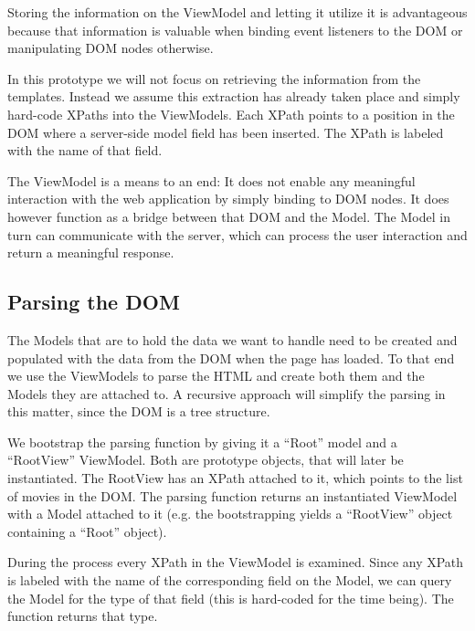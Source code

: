 \documentclass[thesis.tex]{subfiles}
\begin{document}
Storing the information on the ViewModel and letting it utilize it is
advantageous because that information is valuable when binding event listeners
to the DOM or manipulating DOM nodes otherwise.

In this prototype we will not focus on retrieving the information from
the templates. Instead we assume this extraction has already taken place and
simply hard-code XPaths into the ViewModels. Each XPath points to a
position in the DOM where a server-side model field has been inserted.
The XPath is labeled with the name of that field.

The ViewModel is a means to an end: It does not enable any meaningful
interaction with the web application by simply binding to DOM nodes.
It does however function as a bridge between that DOM and the Model.
The Model in turn can communicate with the server, which can process
the user interaction and return a meaningful response.

\subsection{Parsing the DOM}

The Models that are to hold the data we want to handle need to be created and
populated with the data from the DOM when the page has loaded.
To that end we use the ViewModels to parse the HTML and create both them and
the Models they are attached to.
A recursive approach will simplify the parsing in this matter, since the DOM
is a tree structure.

We bootstrap the parsing function by giving it a ``Root'' model and
a ``RootView'' ViewModel.
Both are prototype objects, that will later be instantiated.
The RootView has an XPath attached to it, which points to the list of movies
in the DOM. The parsing function returns an instantiated ViewModel with a Model
attached to it (e.g. the bootstrapping yields a ``RootView'' object containing
a ``Root'' object).

During the process every XPath in the ViewModel is examined.
Since any XPath is labeled with the name of the corresponding field on the
Model, we can query the Model for the type of that field
(this is hard-coded for the time being). The function 
returns that type.
\end{document}
